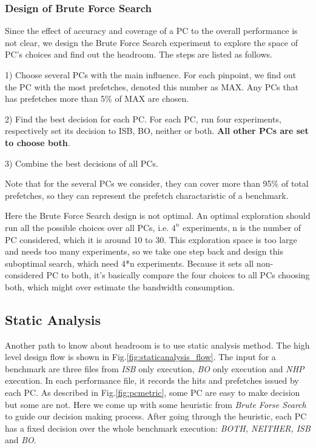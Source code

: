     \subsubsection{Design of Brute Force Search}
    \label{sec:designBFS}
    Since the effect of accuracy and coverage of a PC to the overall performance is not clear, we design the Brute Force Search experiment to explore the space of PC's choices and find out the headroom. The steps are listed as follows. \par
    1) Choose several PCs with the main influence. For each pinpoint, we find out the PC with the most prefetches, denoted this number as MAX. Any PCs that has prefetches more than 5\% of MAX are chosen.\par
    2) Find the best decision for each PC. For each PC, run four experiments, respectively set its decision to ISB, BO, neither or both. \textbf{All other PCs are set to choose both}.\par
    3) Combine the best decisions of all PCs.\par
    Note that for the several PCs we consider, they can cover more than 95\% of total prefetches, so they can represent the prefetch charactaristic of a benchmark. \par
    Here the Brute Force Search design is not optimal. An optimal exploration should run all the possible choices over all PCs, i.e. $4^{n}$ experiments, n is the number of PC considered, which it is around 10 to 30.
    This exploration space is too large and needs too many experiments, so we take one step back and design this suboptimal search, which need 4*n experiments. Because it sets all non-considered PC to both, it's basically compare the four choices to all PCs choosing both, which might over estimate the bandwidth consumption. \par

  \subsection{Static Analysis}
  \label{sec:staticanalysis}
  Another path to know about headroom is to use static analysis method. The high level design flow is shown in Fig.\ref{fig:staticanalysis_flow}. The input for a benchmark are three files from \emph{ISB} only execution, \emph{BO} only execution and \emph{NHP} execution. In each performance file, it records the hits and prefetches issued by each PC. As described in Fig.\ref{fig:pcmetric}, some PC are easy to make decision but some are not. Here we come up with some heuristic from \emph{Brute Forse Search} to guide our decision making process. After going through the heuristic, each PC has a fixed decision over the whole benchmark execution: \emph{BOTH, NEITHER, ISB} and \emph{BO}.

